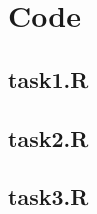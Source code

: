 \documentclass{article}
\begin{document}
\pagebreak
\section{Code}

\subsection*{task1.R}


\subsection*{task2.R}


\subsection*{task3.R}

\end{document}
